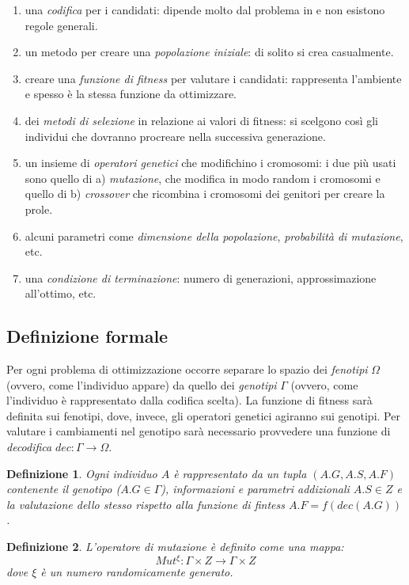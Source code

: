 \documentclass[10pt,a4paper]{article}
\newtheorem{definition}{Definizione}
\begin{document}
\begin{enumerate}
\item{una \emph{codifica} per i candidati: dipende molto dal problema in e non esistono regole generali.}
\item{un metodo per creare una \emph{popolazione iniziale}: di solito si crea casualmente.}
\item{creare una \emph{funzione di fitness} per valutare i candidati: rappresenta l'ambiente e spesso è la stessa funzione da ottimizzare.}
\item{dei \emph{metodi di selezione} in relazione ai valori di fitness: si scelgono così gli individui che dovranno procreare nella successiva generazione.}
\item{un insieme di \emph{operatori genetici} che modifichino i cromosomi: i due più usati sono quello di a) \emph{mutazione}, che modifica in modo random i cromosomi e quello di b) \emph{crossover} che ricombina i cromosomi dei genitori per creare la prole.}
\item{alcuni parametri come \emph{dimensione della popolazione}, \emph{probabilità di mutazione}, etc.}
\item{una \emph{condizione di terminazione}: numero di generazioni, approssimazione all'ottimo, etc.}
\end{enumerate}

\subsection{Definizione formale}

Per ogni problema di ottimizzazione occorre separare lo spazio dei \emph{fenotipi} $\Omega$ (ovvero, come l'individuo appare) da quello dei \emph{genotipi} $\Gamma$ (ovvero, come l'individuo è rappresentato dalla codifica scelta). La funzione di fitness sarà definita sui fenotipi, dove, invece, gli operatori genetici agiranno sui genotipi. Per valutare i cambiamenti nel genotipo sarà necessario provvedere una funzione di \emph{decodifica} $dec: \Gamma \to \Omega$.

\begin{definition}
Ogni \emph{individuo} $A$ è rappresentato da un tupla $(A.G, A.S, A.F)$ contenente il genotipo ($A.G \in \Gamma$), informazioni e parametri addizionali $A.S \in Z$ e la valutazione dello stesso rispetto alla funzione di fintess $A.F = f(dec(A.G))$.
\end{definition}

\begin{definition}
L'operatore di \emph{mutazione} è definito come una mappa:
$$
Mut^{\xi} : \Gamma \times Z \to \Gamma \times Z
$$
dove $\xi$ è un numero randomicamente generato.
\end{definition}
\end{document}
